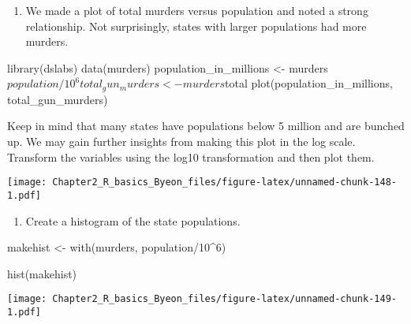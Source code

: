 \documentclass[
]{article}
\newenvironment{Shaded}{\begin{snugshade}}{\end{snugshade}}
\newcommand{\DecValTok}[1]{\textcolor[rgb]{0.00,0.00,0.81}{#1}}
\newcommand{\FunctionTok}[1]{\textcolor[rgb]{0.00,0.00,0.00}{#1}}
\newcommand{\NormalTok}[1]{#1}
\newcommand{\OtherTok}[1]{\textcolor[rgb]{0.56,0.35,0.01}{#1}}
\newcommand{\SpecialCharTok}[1]{\textcolor[rgb]{0.00,0.00,0.00}{#1}}
\providecommand{\tightlist}{%
  \setlength{\itemsep}{0pt}\setlength{\parskip}{0pt}}
\begin{document}
\begin{enumerate}
\def\labelenumi{\arabic{enumi}.}
\tightlist
\item
  We made a plot of total murders versus population and noted a strong
  relationship. Not surprisingly, states with larger populations had
  more murders.
\end{enumerate}

library(dslabs) data(murders) population\_in\_millions \textless-
murders\(population/10^6 total_gun_murders <- murders\)total
plot(population\_in\_millions, total\_gun\_murders)

Keep in mind that many states have populations below 5 million and are
bunched up. We may gain further insights from making this plot in the
log scale. Transform the variables using the log10 transformation and
then plot them.

\begin{Shaded}
\end{Shaded}

\texttt{[image: Chapter2\_R\_basics\_Byeon\_files/figure-latex/unnamed-chunk-148-1.pdf]}

\begin{enumerate}
\def\labelenumi{\arabic{enumi}.}
\setcounter{enumi}{1}
\tightlist
\item
  Create a histogram of the state populations.
\end{enumerate}

\begin{Shaded}
\begin{Highlighting}[]
\NormalTok{makehist }\OtherTok{\textless{}{-}} \FunctionTok{with}\NormalTok{(murders, population}\SpecialCharTok{/}\DecValTok{10}\SpecialCharTok{\^{}}\DecValTok{6}\NormalTok{)}

\FunctionTok{hist}\NormalTok{(makehist)}
\end{Highlighting}
\end{Shaded}

\texttt{[image: Chapter2\_R\_basics\_Byeon\_files/figure-latex/unnamed-chunk-149-1.pdf]}
\end{document}
